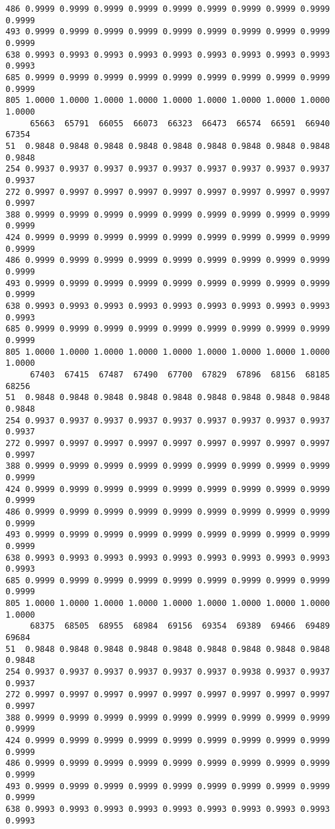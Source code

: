 \documentclass[
]{report}
\begin{document}
\begin{verbatim}
486 0.9999 0.9999 0.9999 0.9999 0.9999 0.9999 0.9999 0.9999 0.9999 0.9999
493 0.9999 0.9999 0.9999 0.9999 0.9999 0.9999 0.9999 0.9999 0.9999 0.9999
638 0.9993 0.9993 0.9993 0.9993 0.9993 0.9993 0.9993 0.9993 0.9993 0.9993
685 0.9999 0.9999 0.9999 0.9999 0.9999 0.9999 0.9999 0.9999 0.9999 0.9999
805 1.0000 1.0000 1.0000 1.0000 1.0000 1.0000 1.0000 1.0000 1.0000 1.0000
     65663  65791  66055  66073  66323  66473  66574  66591  66940  67354
51  0.9848 0.9848 0.9848 0.9848 0.9848 0.9848 0.9848 0.9848 0.9848 0.9848
254 0.9937 0.9937 0.9937 0.9937 0.9937 0.9937 0.9937 0.9937 0.9937 0.9937
272 0.9997 0.9997 0.9997 0.9997 0.9997 0.9997 0.9997 0.9997 0.9997 0.9997
388 0.9999 0.9999 0.9999 0.9999 0.9999 0.9999 0.9999 0.9999 0.9999 0.9999
424 0.9999 0.9999 0.9999 0.9999 0.9999 0.9999 0.9999 0.9999 0.9999 0.9999
486 0.9999 0.9999 0.9999 0.9999 0.9999 0.9999 0.9999 0.9999 0.9999 0.9999
493 0.9999 0.9999 0.9999 0.9999 0.9999 0.9999 0.9999 0.9999 0.9999 0.9999
638 0.9993 0.9993 0.9993 0.9993 0.9993 0.9993 0.9993 0.9993 0.9993 0.9993
685 0.9999 0.9999 0.9999 0.9999 0.9999 0.9999 0.9999 0.9999 0.9999 0.9999
805 1.0000 1.0000 1.0000 1.0000 1.0000 1.0000 1.0000 1.0000 1.0000 1.0000
     67403  67415  67487  67490  67700  67829  67896  68156  68185  68256
51  0.9848 0.9848 0.9848 0.9848 0.9848 0.9848 0.9848 0.9848 0.9848 0.9848
254 0.9937 0.9937 0.9937 0.9937 0.9937 0.9937 0.9937 0.9937 0.9937 0.9937
272 0.9997 0.9997 0.9997 0.9997 0.9997 0.9997 0.9997 0.9997 0.9997 0.9997
388 0.9999 0.9999 0.9999 0.9999 0.9999 0.9999 0.9999 0.9999 0.9999 0.9999
424 0.9999 0.9999 0.9999 0.9999 0.9999 0.9999 0.9999 0.9999 0.9999 0.9999
486 0.9999 0.9999 0.9999 0.9999 0.9999 0.9999 0.9999 0.9999 0.9999 0.9999
493 0.9999 0.9999 0.9999 0.9999 0.9999 0.9999 0.9999 0.9999 0.9999 0.9999
638 0.9993 0.9993 0.9993 0.9993 0.9993 0.9993 0.9993 0.9993 0.9993 0.9993
685 0.9999 0.9999 0.9999 0.9999 0.9999 0.9999 0.9999 0.9999 0.9999 0.9999
805 1.0000 1.0000 1.0000 1.0000 1.0000 1.0000 1.0000 1.0000 1.0000 1.0000
     68375  68505  68955  68984  69156  69354  69389  69466  69489  69684
51  0.9848 0.9848 0.9848 0.9848 0.9848 0.9848 0.9848 0.9848 0.9848 0.9848
254 0.9937 0.9937 0.9937 0.9937 0.9937 0.9937 0.9938 0.9937 0.9937 0.9937
272 0.9997 0.9997 0.9997 0.9997 0.9997 0.9997 0.9997 0.9997 0.9997 0.9997
388 0.9999 0.9999 0.9999 0.9999 0.9999 0.9999 0.9999 0.9999 0.9999 0.9999
424 0.9999 0.9999 0.9999 0.9999 0.9999 0.9999 0.9999 0.9999 0.9999 0.9999
486 0.9999 0.9999 0.9999 0.9999 0.9999 0.9999 0.9999 0.9999 0.9999 0.9999
493 0.9999 0.9999 0.9999 0.9999 0.9999 0.9999 0.9999 0.9999 0.9999 0.9999
638 0.9993 0.9993 0.9993 0.9993 0.9993 0.9993 0.9993 0.9993 0.9993 0.9993

\end{verbatim}
\end{document}
